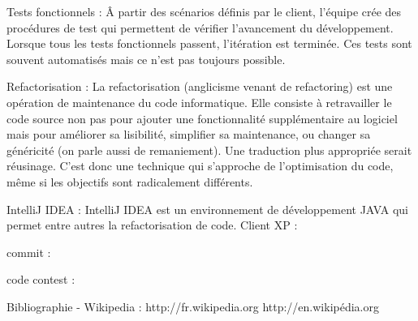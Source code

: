 \documentclass{article}
\begin{document}
Tests fonctionnels : \^A partir des scénarios définis par le client, l'équipe crée des procédures de test qui permettent de vérifier l'avancement du développement. Lorsque tous les tests fonctionnels passent, l'itération est terminée. Ces tests sont souvent automatisés mais ce n'est pas toujours possible. 

Refactorisation : La refactorisation (anglicisme venant de refactoring) est une opération de maintenance du code informatique. Elle consiste à retravailler le code source non pas pour ajouter une fonctionnalité supplémentaire au logiciel mais pour améliorer sa lisibilité, simplifier sa maintenance, ou changer sa généricité (on parle aussi de remaniement). Une traduction plus appropriée serait réusinage. C'est donc une technique qui s'approche de l'optimisation du code, même si les objectifs sont radicalement différents. 

IntelliJ IDEA : IntelliJ IDEA est un environnement de développement JAVA qui permet entre autres la refactorisation de code.
Client XP : 

commit : 

code contest :



Bibliographie
- Wikipedia : 
http://fr.wikipedia.org
http://en.wikipédia.org
\end{document}
